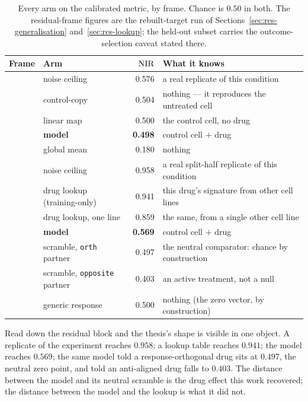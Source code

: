\begin{table}[h]
\centering
\begin{tabular}{llrl}
\toprule
Frame & Arm & $\textrm{NIR}$ & What it knows \\
\midrule
{}
 & noise ceiling & 0.576 & a real replicate of this condition \\
 & control-copy & 0.504 & nothing --- it reproduces the untreated cell \\
 & linear map & 0.500 & the control cell, no drug \\
 & \textbf{model} & \textbf{0.498} & control cell $+$ drug \\
 & global mean & 0.180 & nothing \\
\midrule
{}
 & noise ceiling & 0.958 & a real split-half replicate of this condition \\
 & drug lookup (training-only) & 0.941 & this drug's signature from other cell lines \\
 & drug lookup, one line & 0.859 & the same, from a single other cell line \\
 & \textbf{model} & \textbf{0.569} & control cell $+$ drug \\
 & scramble, \texttt{orth} partner & 0.497 & the neutral comparator: chance by construction \\
 & scramble, \texttt{opposite} partner & 0.403 & an active treatment, not a null \\
 & generic response & 0.500 & nothing (the zero vector, by construction) \\
\bottomrule
\end{tabular}
\caption{Every arm on the calibrated metric, by frame. Chance is $0.50$ in both. The residual-frame
figures are the rebuilt-target run of Sections~\ref{sec:res-generalisation}
and~\ref{sec:res-lookup}; the held-out subset carries the outcome-selection caveat stated there.}
\label{tab:allarms}
\end{table}

Read down the residual block and the thesis's shape is visible in one object. A replicate of the
experiment reaches $0.958$; a lookup table reaches $0.941$; the model reaches $0.569$; the same
model told a response-orthogonal drug sits at $0.497$, the neutral zero point, and told an
anti-aligned drug falls to $0.403$. The distance between the model and its neutral scramble is the
drug effect this work recovered; the distance between the model and the lookup is what it did not.

